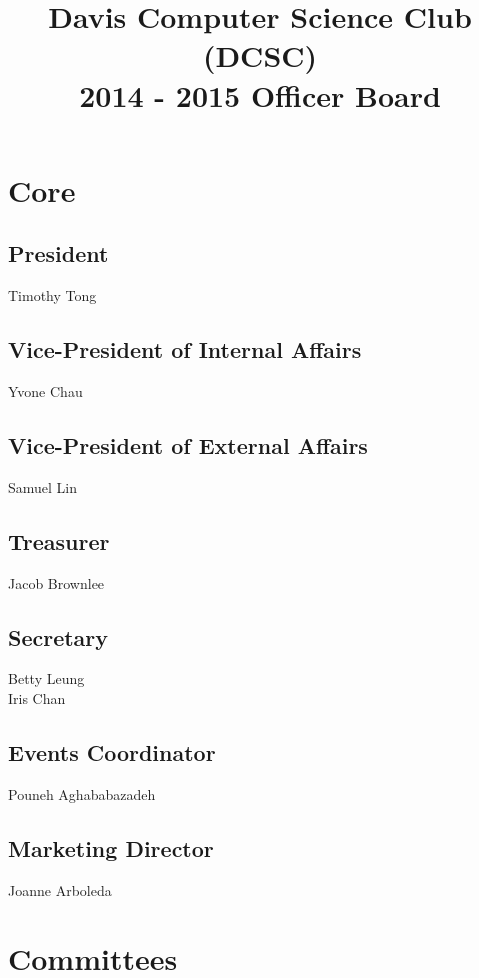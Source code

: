 \documentclass[10pt]{article}
\title{Davis Computer Science Club (DCSC)\\2014 - 2015 Officer Board}
\date{}
\author{}
\begin{document}
\maketitle

\section{Core}

\subsection{President}

Timothy Tong

\subsection{Vice-President of Internal Affairs}

Yvone Chau

\subsection{Vice-President of External Affairs}

Samuel Lin

\subsection{Treasurer}

Jacob Brownlee

\subsection{Secretary}

Betty Leung\\
Iris Chan

\subsection{Events Coordinator}

Pouneh Aghababazadeh

\subsection{Marketing Director}

Joanne Arboleda

\section{Committees}
\end{document}
